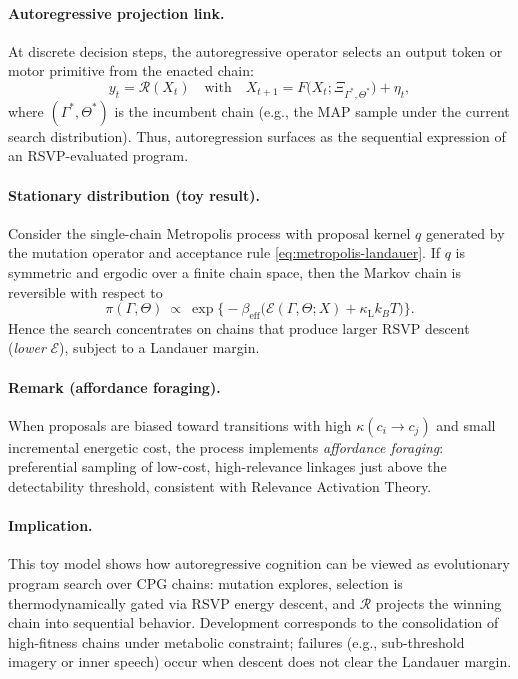 \documentclass[a4paper,11pt]{article}
\begin{document}
\paragraph{Autoregressive projection link.}
At discrete decision steps, the autoregressive operator selects an output token
or motor primitive from the enacted chain:
\begin{equation}
\label{eq:proj-cpg}
y_t=\mathcal{R}(X_t)
\quad\text{with}\quad
X_{t+1}=F\big(X_t;\Xi_{\Gamma^*,\Theta^*}\big)+\eta_t,
\end{equation}
where $(\Gamma^*,\Theta^*)$ is the incumbent chain (e.g., the MAP sample under the
current search distribution). Thus, autoregression surfaces as the sequential
expression of an RSVP-evaluated program.

\paragraph{Stationary distribution (toy result).}
Consider the single-chain Metropolis process with proposal kernel $q$ generated
by the mutation operator and acceptance rule \eqref{eq:metropolis-landauer}.
If $q$ is symmetric and ergodic over a finite chain space, then the Markov
chain is reversible with respect to
\begin{equation}
\label{eq:stationary}
\pi(\Gamma,\Theta)\ \propto\ \exp\!\Big\{-\beta_{\mathrm{eff}}
\big(\mathcal{E}(\Gamma,\Theta;X)+\kappa_{\mathrm{L}} k_B T\big)\Big\}.
\end{equation}
Hence the search concentrates on chains that produce larger RSVP descent
(\emph{lower} $\mathcal{E}$), subject to a Landauer margin.

\paragraph{Remark (affordance foraging).}
When proposals are biased toward transitions with high $\kappa(c_i\!\to\! c_j)$
and small incremental energetic cost, the process implements \emph{affordance
foraging}: preferential sampling of low-cost, high-relevance linkages just above
the detectability threshold, consistent with Relevance Activation Theory.

\paragraph{Implication.}
This toy model shows how autoregressive cognition can be viewed as evolutionary
program search over CPG chains: mutation explores, selection is thermodynamically
gated via RSVP energy descent, and $\mathcal{R}$ projects the winning chain into
sequential behavior. Development corresponds to the consolidation of high-fitness
chains under metabolic constraint; failures (e.g., sub-threshold imagery or inner
speech) occur when descent does not clear the Landauer margin.
\end{document}
